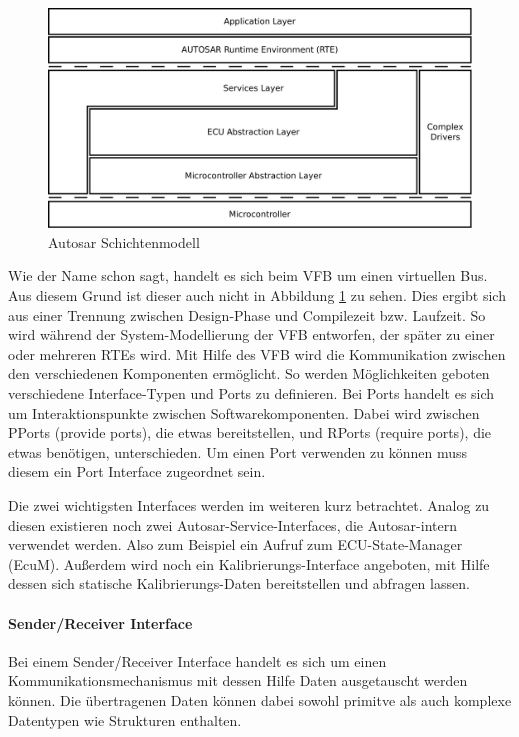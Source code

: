 \documentclass[
  a4paper,					    %
  twoside,
  DIV=calc,     				%
  bibliography=totoc,
  cleardoublepage=empty,
  ngerman,     					%
  final       					%
]{scrbook}
\begin{document}
\begin{figure}[!htbp]
    \centering
    \includegraphics[width=1\textwidth]{autosar_layer.png}
    \caption{Autosar Schichtenmodell}
    \label{fig:autosar_layer}
\end{figure}

Wie der Name schon sagt, handelt es sich beim VFB um einen virtuellen Bus. Aus diesem Grund ist dieser auch nicht in Abbildung \ref{fig:autosar_layer} zu sehen. Dies ergibt sich aus einer Trennung zwischen Design-Phase und Compilezeit bzw. Laufzeit. So wird während der System-Modellierung der VFB entworfen, der später zu einer oder mehreren RTEs wird. Mit Hilfe des VFB wird die Kommunikation zwischen den verschiedenen Komponenten ermöglicht. So werden Möglichkeiten geboten verschiedene Interface-Typen und Ports zu definieren. Bei Ports handelt es sich um Interaktionspunkte zwischen Softwarekomponenten. Dabei wird zwischen PPorts (provide ports), die etwas bereitstellen, und RPorts (require ports), die etwas benötigen, unterschieden. Um einen Port verwenden zu können muss diesem ein Port Interface zugeordnet sein.

Die zwei wichtigsten Interfaces werden im weiteren kurz betrachtet. Analog zu diesen existieren noch zwei Autosar-Service-Interfaces, die Autosar-intern verwendet werden. Also zum Beispiel ein Aufruf zum ECU-State-Manager (EcuM). Außerdem wird noch ein Kalibrierungs-Interface angeboten, mit Hilfe dessen sich statische Kalibrierungs-Daten bereitstellen und abfragen lassen.

\paragraph{Sender/Receiver Interface}
Bei einem Sender/Receiver Interface handelt es sich um einen Kommunikationsmechanismus mit dessen Hilfe Daten ausgetauscht werden können. Die übertragenen Daten können dabei sowohl primitve als auch komplexe Datentypen wie Strukturen enthalten.
\end{document}
